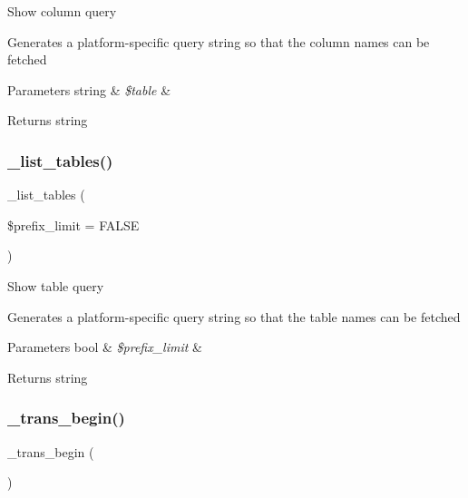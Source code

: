 Show column query

Generates a platform-\/specific query string so that the column names can be fetched


\begin{DoxyParams}[1]{Parameters}
string & {\em \$table} & \\
\hline
\end{DoxyParams}
\begin{DoxyReturn}{Returns}
string 
\end{DoxyReturn}
\mbox{\label{class_c_i___d_b__odbc__driver_a435c0f3ce54fe7daa178baa8532ebd54}} 
\subsubsection{\texorpdfstring{\+\_\+list\+\_\+tables()}{\_list\_tables()}}
{\footnotesize\ttfamily \+\_\+list\+\_\+tables (\begin{DoxyParamCaption}\item[{}]{\$prefix\+\_\+limit = {\ttfamily FALSE} }\end{DoxyParamCaption})\hspace{0.3cm}{\ttfamily [protected]}}

Show table query

Generates a platform-\/specific query string so that the table names can be fetched


\begin{DoxyParams}[1]{Parameters}
bool & {\em \$prefix\+\_\+limit} & \\
\hline
\end{DoxyParams}
\begin{DoxyReturn}{Returns}
string 
\end{DoxyReturn}
\mbox{\label{class_c_i___d_b__odbc__driver_ac81ac882c1d54347d810199a15856aac}} 
\subsubsection{\texorpdfstring{\+\_\+trans\+\_\+begin()}{\_trans\_begin()}}
{\footnotesize\ttfamily \+\_\+trans\+\_\+begin (\begin{DoxyParamCaption}{ }\end{DoxyParamCaption})\hspace{0.3cm}{\ttfamily [protected]}}

